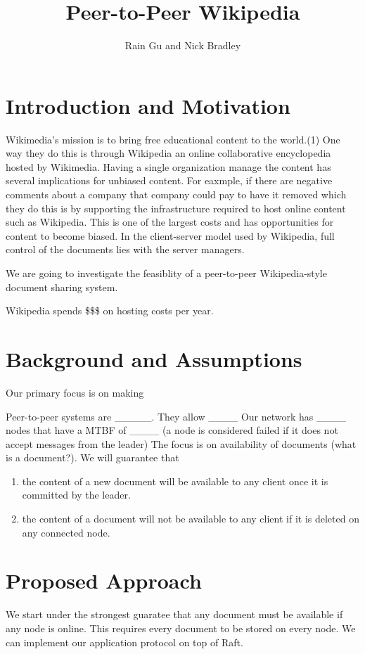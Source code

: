\documentclass{article}
\title{Peer-to-Peer Wikipedia}
\author{Rain Gu and Nick Bradley}
\begin{document}
\maketitle

\section{Introduction and Motivation}
Wikimedia's mission is to bring free educational content to the world.(1) One way
they do this is through Wikipedia an online collaborative encyclopedia hosted by
Wikimedia. Having a single organization manage the content has several implications
for unbiased content. For eaxmple, if there are negative comments about a company
that company could pay to have it removed
which they do this is by supporting the infrastructure required to host online
content such as Wikipedia. This is one of the largest costs and has opportunities
for content to become biased. In the client-server model used by Wikipedia, full
control of the documents lies with the server managers.

We are going to investigate the feasiblity of a peer-to-peer Wikipedia-style document
sharing system.

Wikipedia spends \$\$\$ on hosting costs per year.

\section{Background and Assumptions}
Our primary focus is on making


Peer-to-peer systems are _____. They allow ____
Our network has ____ nodes that have a MTBF of ____ (a node is considered failed if
it does not accept messages from the leader)
The focus is on availability of documents (what is a document?). We will guarantee that
\begin{enumerate}
  \item the content of a new document will be available to any client once it is
  committed by the leader.
  \item the content of a document will not be available to any client if it is
  deleted on any connected node.
\end{enumerate}



\section{Proposed Approach}
We start under the strongest guaratee that any document must be available if any
node is online. This requires every document to be stored on every node. We can
implement our application protocol on top of Raft.
\end{document}

